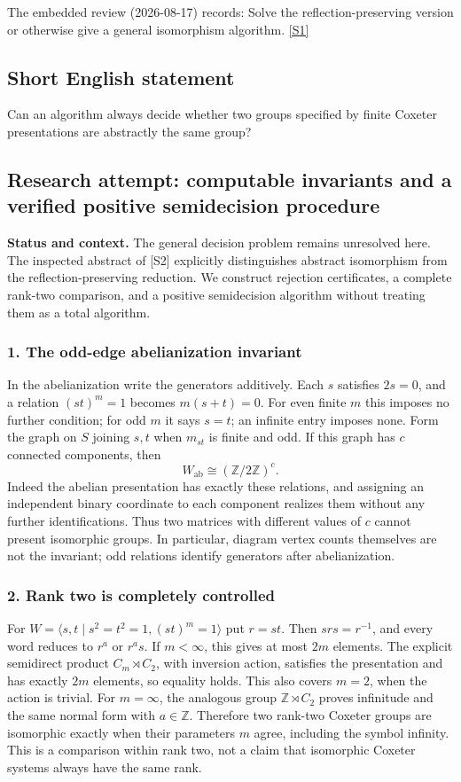 \documentclass[11pt,a4paper]{article}
\newcommand{\sref}[2]{\hyperlink{source:#1:#2}{[S#2]}}
\begin{document}
The embedded review (2026-08-17) records: Solve the reflection-preserving version or otherwise give a general isomorphism algorithm. \sref{statement}{1}

\subsection{Short English statement}

Can an algorithm always decide whether two groups specified by finite Coxeter presentations are abstractly the same group?

\subsection{Research attempt: computable invariants and a verified positive semidecision procedure}
\textbf{Status and context.} The general decision problem remains unresolved here. The inspected abstract of [S2] explicitly distinguishes abstract isomorphism from the reflection-preserving reduction. We construct rejection certificates, a complete rank-two comparison, and a positive semidecision algorithm without treating them as a total algorithm.

\subsubsection{1. The odd-edge abelianization invariant}
In the abelianization write the generators additively. Each $s$ satisfies $2s=0$, and a relation $(st)^m=1$ becomes $m(s+t)=0$. For even finite $m$ this imposes no further condition; for odd $m$ it says $s=t$; an infinite entry imposes none. Form the graph on $S$ joining $s,t$ when $m_{st}$ is finite and odd. If this graph has $c$ connected components, then
\[W_{\mathrm{ab}}\cong(\mathbb Z/2\mathbb Z)^c.\tag{1}\]
Indeed the abelian presentation has exactly these relations, and assigning an independent binary coordinate to each component realizes them without any further identifications. Thus two matrices with different values of $c$ cannot present isomorphic groups. In particular, diagram vertex counts themselves are not the invariant; odd relations identify generators after abelianization.

\subsubsection{2. Rank two is completely controlled}
For $W=\langle s,t\mid s^2=t^2=1,(st)^m=1\rangle$ put $r=st$. Then $srs=r^{-1}$, and every word reduces to $r^a$ or $r^as$. If $m<\infty$, this gives at most $2m$ elements. The explicit semidirect product $C_m\rtimes C_2$, with inversion action, satisfies the presentation and has exactly $2m$ elements, so equality holds. This also covers $m=2$, when the action is trivial. For $m=\infty$, the analogous group $\mathbb Z\rtimes C_2$ proves infinitude and the same normal form with $a\in\mathbb Z$. Therefore two rank-two Coxeter groups are isomorphic exactly when their parameters $m$ agree, including the symbol infinity. This is a comparison within rank two, not a claim that isomorphic Coxeter systems always have the same rank.
\end{document}
